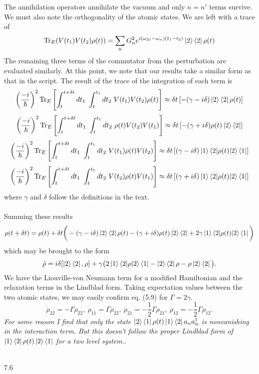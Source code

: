 \documentclass[10pt,letterpaper]{article}
\begin{document}
The annihilation operators annihilate the vacuum and only $n=n'$ terms survive. We must also note the 
orthogonality of the atomic states. We are left with a trace of
\[
	\text{Tr}_E(V(t_1)V(t_2)\rho(t)) = \sum_{n}G_n^2e^{i(\omega_{21}-\omega_n)(t_1-t_2)}\ket 2\bra 2\rho(t)
\]
The remaining three terms of the commutator from the perturbation are evaluated similarly. At this point, we note that our results take a similar form as that in the script. The
result of the trace of the integration of each term is
\[
	\left(\frac{-i}{\hbar}\right)^2\text{Tr}_E \left[ \int_t^{t+\delta t}dt_1\ \int_{t}^{t_1}dt_2\ V(t_1)V(t_2)\rho(t)\right]
	\approx \delta t\left[-(\gamma-i\delta)\ket 2\bra 2\rho(t)\right]
\]
\[
	\left(\frac{-i}{\hbar}\right)^2\text{Tr}_E \left[ \int_t^{t+\delta t}dt_1\ \int_{t}^{t_1}dt_2\ \rho(t)V(t_2)V(t_1)\right]
	\approx \delta t\left[-(\gamma+i\delta)\rho(t)\ket 2\bra 2\right]
\]
\[
	\left(\frac{-i}{\hbar}\right)^2\text{Tr}_E \left[ \int_t^{t+\delta t}dt_1\ \int_{t}^{t_1}dt_2\ V(t_1)\rho(t)V(t_2)\right]
	\approx \delta t\left[(\gamma-i\delta)\ket 1\braket{2|\rho(t)|2}\bra 1\right]
\]
\[
	\left(\frac{-i}{\hbar}\right)^2\text{Tr}_E \left[ \int_t^{t+\delta t}dt_1\ \int_{t}^{t_1}dt_2\ V(t_2)\rho(t)V(t_1)\right]
	\approx \delta t\left[(\gamma+i\delta)\ket 1\braket{2|\rho(t)|2}\bra 1\right]
\]
where $\gamma$ and $\delta$ follow the definitions in the text. \\ \\
Summing these results
\[
	\rho(t+\delta t) = \rho(t) +\delta t\bigg(-(\gamma-i\delta)\ket 2\bra 2\rho(t)-
	(\gamma+i\delta)\rho(t)\ket 2\bra 2+2\gamma\ket 1\braket{2|\rho(t)|2}\bra 1 \bigg)
\]
which may be brought to the form
\[
	\dot\rho = i\delta[\ket 2\bra 2,\rho]+\gamma\big(2\ket 1\braket{2|\rho|2}\bra 1-\ket 2\bra 2\rho-\rho
	\ket 2\bra 2\big).
\]
We have the Liouville-von Neumann term for a modified Hamiltonian and the relaxation terms in the Lindblad form.
Taking expectation values between the two atomic states, we may easily confirm eq. (5.9) for $\Gamma = 2\gamma$.
\[
	\dot\rho_{22} = -\Gamma\rho_{22},\ \dot\rho_{11} = \Gamma\rho_{22},\ \dot\rho_{21} = -\frac{1}{2}
	\Gamma\rho_{21},\ \dot\rho_{12} = -\frac{1}{2}\Gamma\rho_{12}.
\]
\emph{For some reason I find that only the state $\ket 2\bra 1\rho(t)\ket 1\bra 2a_na^\dag_n$ is nonvanishing
in the interaction term. But this doesn't follow the proper Lindblad form of $\ket 1\bra 2\rho(t)\ket 2\bra 1$ for a two level system.. }
\\ \\
\item[7.6]
\end{document}
